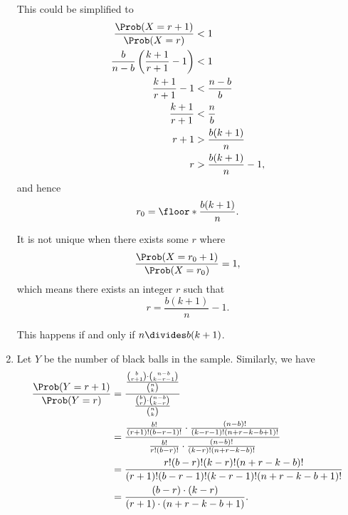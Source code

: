\begin{enumerate}
          This could be simplified to
          \begin{align*}
              \frac{\Prob(X = r + 1)}{\Prob(X = r)}                & < 1                       \\
              \frac{b}{n - b} \left(\frac{k + 1}{r + 1} - 1\right) & < 1                       \\
              \frac{k + 1}{r + 1} - 1                              & < \frac{n - b}{b}         \\
              \frac{k + 1}{r + 1}                                  & < \frac{n}{b}             \\
              r + 1                                                & > \frac{b(k + 1)}{n}      \\
              r                                                    & > \frac{b(k + 1)}{n} - 1,
          \end{align*}
          and hence
          \[
              r_0 = \floor*{\frac{b(k + 1)}{n}}.
          \]

          It is not unique when there exists some \(r\) where
          \[
              \frac{\Prob(X = r_0 + 1)}{\Prob(X = r_0)} = 1,
          \]
          which means there exists an integer \(r\) such that
          \[
              r = \frac{b(k + 1)}{n} - 1.
          \]

          This happens if and only if \(n \divides b(k + 1)\).

    \item Let \(Y\) be the number of black balls in the sample. Similarly, we have
          \begin{align*}
              \frac{\Prob(Y = r + 1)}{\Prob(Y = r)} & = \frac{\frac{\binom{b}{r + 1} \cdot \binom{n - b}{k - r - 1}}{\binom{n}{k}}}{\frac{\binom{b}{r} \cdot \binom{n - b}{k - r}}{\binom{n}{k}}}                                \\
                                                    & = \frac{\frac{b!}{(r + 1)! (b - r - 1)!} \cdot \frac{(n - b)!}{(k - r - 1)!(n + r - k - b + 1)!}}{\frac{b!}{r! (b - r)!} \cdot \frac{(n - b)!}{(k - r)! (n + r - k - b)!}} \\
                                                    & = \frac{r! (b - r)! (k - r)! (n + r - k - b)!}{(r + 1)! (b - r - 1)! (k - r - 1)! (n + r - k - b + 1)!}                                                                    \\
                                                    & = \frac{(b - r) \cdot (k - r)}{(r + 1) \cdot (n + r - k - b + 1)}.
          \end{align*}


\end{enumerate}

